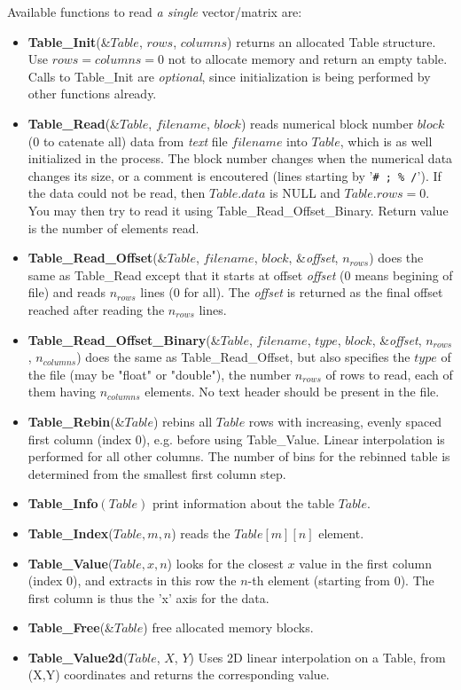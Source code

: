 Available functions to read \emph{a single} vector/matrix are:
\begin{itemize}
\item {\bf Table\_Init}(\&$Table$, $rows$, $columns$) returns an allocated
  Table structure. Use $rows=columns=0$ not to allocate memory and return an empty table.
  Calls to Table\_Init are \emph{optional}, since initialization is being
  performed by other functions already.
\item {\bf Table\_Read}(\&$Table$, $filename$, $block$)
  reads numerical block number
  $block$ (0 to catenate all) data from \emph{text} file $filename$ into $Table$,
  which is as well initialized in the process.
  The block number changes when the numerical data changes its size,
  or a comment is encoutered (lines starting
  by '\verb+# ; % /+'). If the data could not be read,
  then $Table.data$ is NULL and $Table.rows = 0$.
  You may then try to read it using Table\_Read\_Offset\_Binary.
  Return value is the number of elements read.
\item {\bf Table\_Read\_Offset}(\&$Table$, $filename$, $block$, \&\textit{offset}, $n_{rows}$)
  does the same as Table\_Read except that it starts at offset \textit{offset}
  (0 means begining of file) and reads $n_{rows}$ lines (0 for all).
  The \textit{offset} is returned as the final offset reached after
  reading the $n_{rows}$ lines.
\item {\bf Table\_Read\_Offset\_Binary}(\&$Table$, $filename$, $type$,
  $block$, \&\textit{offset}, $n_{rows}$, $n_{columns}$) does the same as
  Table\_Read\_Offset, but also specifies the $type$ of the file (may
  be "float" or "double"), the number $n_{rows}$ of rows to read, each
  of them having $n_{columns}$ elements. No text header should be present
  in the file.
\item {\bf Table\_Rebin}(\&$Table$) rebins all $Table$ rows with increasing, evenly spaced first column (index 0), e.g. before using Table\_Value. Linear interpolation is performed for all other columns. The number of bins for the rebinned table is determined from the smallest first column step.
\item {\bf Table\_Info}$(Table)$ print information about the table $Table$.
\item {\bf Table\_Index}($Table, m, n$) reads the $Table[m][n]$ element.
\item {\bf Table\_Value}($Table, x, n$) looks for the closest $x$
  value in the first column (index 0), and extracts in this row the
  $n$-th element (starting from 0). The first column is thus the 'x' axis for the data.
\item {\bf Table\_Free}(\&$Table$) free allocated memory blocks.
\item {\bf Table\_Value2d}($Table$, $X$, $Y$) Uses 2D linear interpolation on a Table, from (X,Y) coordinates and returns the corresponding value.
\end{itemize}

